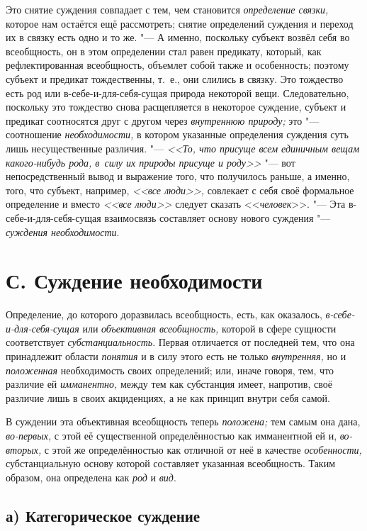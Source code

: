 Это снятие суждения совпадает с тем, чем становится {\em определение связки,}
которое нам остаётся ещё рассмотреть; снятие определений суждения и переход их
в связку есть одно и то же. "--- А именно, поскольку субъект возвёл себя во
всеобщность, он в этом определении стал равен предикату, который, как
рефлектированная всеобщность, объемлет собой также и особенность; поэтому
субъект и предикат тождественны, т.~е., они слились в связку. Это тождество
есть род или в-себе-и-для-себя-сущая природа некоторой вещи. Следовательно,
поскольку это тождество снова расщепляется в некоторое суждение, субъект и
предикат соотносятся друг с другом через {\em внутреннюю природу;} это "---
соотношение {\em необходимости,} в котором указанные определения суждения суть
лишь несущественные различия. "--- {\em <<То, что присуще всем единичным вещам
какого-нибудь рода, в~силу их природы присуще и роду>>} "--- вот
непосредственный вывод и выражение того, что получилось раньше, а именно, того,
что субъект, например, {\em <<все люди>>,} совлекает с себя своё формальное
определение и вместо {\em <<все люди>>} следует сказать <<{\em человек}>>. "---
Эта в-себе-и-для-себя-сущая взаимосвязь составляет основу нового суждения "---
{\em суждения необходимости}.

\section[С. Суждение необходимости]{С. Суждение необходимости}

Определение, до которого доразвилась всеобщность, есть, как
оказалось, {\em в-себе-и-для-себя-сущая} или {\em объективная
всеобщность,} которой в сфере сущности соответствует {\em субстанциальность}.
Первая отличается от последней тем, что она принадлежит
области {\em понятия} и в силу этого есть не только {\em внутренняя,} но и
{\em положенная} необходимость своих определений; или, иначе говоря, тем, что
различие ей {\em имманентно,}
между тем как субстанция имеет, напротив, своё различие лишь
в своих акциденциях, а не как принцип внутри себя самой.

В суждении эта объективная всеобщность теперь {\em положена;} тем самым
она дана, {\em во-первых,} с этой её существенной определённостью как
имманентной ей и, {\em во-вторых,} с этой
же определённостью как отличной от неё в качестве {\em особенности,}
субстанциальную основу которой составляет указанная
всеобщность. Таким образом, она определена как {\em род} и {\em вид}.

\subsection[а) Категорическое суждение]{а) Категорическое суждение}

